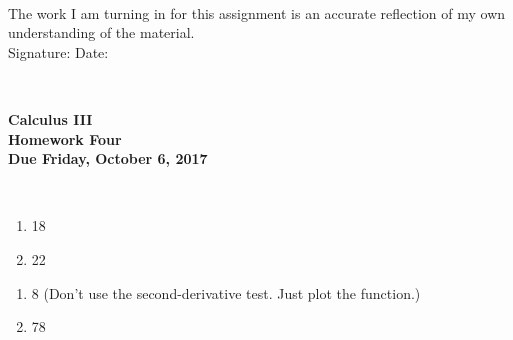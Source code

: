 \documentclass[12pt]{article}
\begin{document}
\\

\bigskip
\bigskip
\bigskip
\bigskip
\bigskip
\bigskip
\noindent The work I am turning in for this assignment is an accurate
reflection of my own understanding of the material.\\[14pt]

\noindent Signature: \underline{\hspace{7cm}} \hspace{1cm} Date:
\underline{\hspace{5cm}} 


\hspace{2mm}\\
\newpage



 
\begin{center}
{\large {\bf Calculus III}}\\
\medskip
{\large {\bf Homework Four}}\\
\medskip
{ {\bf Due Friday, October 6, 2017}}\\
\end{center}

\hspace{2mm}\\



\begin{enumerate}
\setlength{\itemsep}{-1mm}
  \item 18
  \item 22
\end{enumerate}


\begin{enumerate}
\setlength{\itemsep}{-1mm}
  \item 8 (Don't use the second-derivative test. Just plot the
    function.) 
  \item 78
\end{enumerate}
\end{document}
